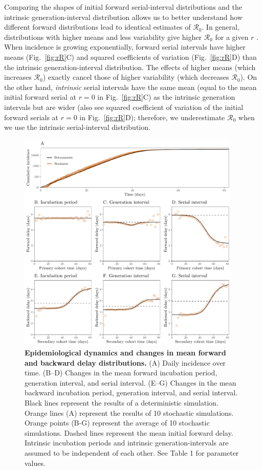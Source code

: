 \documentclass[12pt]{article}
\newcommand{\fref}[1]{Fig.~\ref{fig:#1}}
\newcommand{\Rx}[1]{\ensuremath{{\mathcal R}_{#1}}\xspace}
\newcommand{\Ro}{\Rx{0}}
\begin{document}
Comparing the shapes of initial forward serial-interval distributions and the intrinsic generation-interval distribution allows us to better understand how different forward distributions lead to identical estimates of \Ro.
In general, distributions with higher means and less variability give higher \Ro for a given $r$ \citep{wallinga2007generation, park2019practical}.
When incidence is growing exponentially, forward serial intervals have higher means (\fref{rR}C) and squared coefficients of variation (\fref{rR}D) than the intrinsic generation-interval distribution.
The effects of higher means (which increases \Ro) exactly cancel those of higher variability (which decreases \Ro).
On the other hand, \emph{intrinsic} serial intervals have the same mean (equal to the mean initial forward serial at $r=0$ in \fref{rR}C) as the intrinsic generation intervals but are wider (also see squared coefficient of variation of the initial forward serials at $r=0$ in \fref{rR}D); 
therefore, we underestimate \Ro when we use the intrinsic serial-interval distribution.

\begin{figure}[!ht]
\begin{center}
\includegraphics[width=0.95\textwidth]{forward.pdf}
\caption{
\textbf{Epidemiological dynamics and changes in mean forward and backward delay distributions.}
(A) Daily incidence over time.
(B--D) Changes in the mean forward incubation period, generation interval, and serial interval.
(E--G) Changes in the mean backward incubation period, generation interval, and serial interval.
Black lines represent the results of a deterministic simulation.
Orange lines (A) represent the results of 10 stochastic simulations.
Orange points (B-G) represent the average of 10 stochastic simulations.
Dashed lines represent the mean initial forward delay.
Intrinsic incubation periods and intrinsic generation-intervals are assumed to be independent of each other.
See Table 1 for parameter values.
}
\label{fig:epi}
\end{center}
\end{figure}
\end{document}
